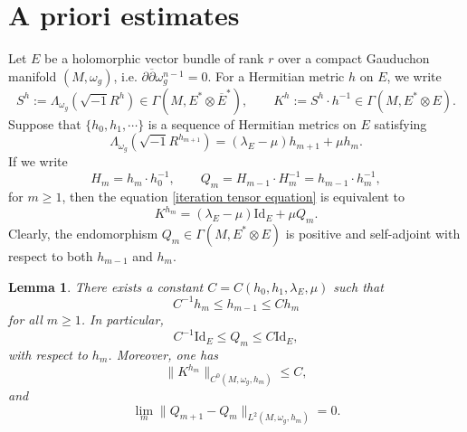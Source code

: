 \documentclass[12pt, reqno]{amsart}
\newcommand{\id}{\mathrm{Id}}
\newcommand\bp{{\bar\partial}}
\theoremstyle{plain}
\newtheorem{lemma}[thm]{Lemma}
\theoremstyle{definition}
\newcommand{\blemma}{\begin{lemma}}
\newcommand{\elemma}{\end{lemma}}
\newcommand{\p}{\partial}
\renewcommand{\bar}{\overline}
\newcommand{\beq}{\begin{equation}}
\newcommand{\eeq}{\end{equation}}
\renewcommand{\bp}{\bar{\partial}}
\newcommand{\ts}{\otimes}
\renewcommand{\>}{\rightarrow}
\newcommand{\om}{\omega}
\numberwithin{equation}{section}
\begin{document}
\baselineskip
\section{A priori estimates}\label{background section}
Let $E$ be a holomorphic vector bundle of rank $r$ over a compact Gauduchon manifold $(M,\om_g)$, i.e. $\p\bp\omega_g^{n-1}=0$.
For a Hermitian metric $h$ on $E$, we write
\begin{equation}
S^h:=\Lambda_{\omega_g}\left(\sqrt{-1}R^h\right)
\in\Gamma(M,E^*\ts\bar E^*),
\qquad
K^h:=S^h\cdot h^{-1}\in\Gamma(M,E^*\ts E).
\label{S and K}
\end{equation}
Suppose that $\{h_0,h_1,\cdots\}$ is a sequence of Hermitian metrics on $E$ satisfying
\beq 
\Lambda_{\omega_g}\left(\sqrt{-1}R^{h_{m+1}}\right)
=(\lambda_E-\mu)h_{m+1}+\mu h_m. \label{iteration tensor equation}
\eeq 
If we write
\begin{equation}
H_m=h_m\cdot h_0^{-1},
\qquad
Q_m=H_{m-1}\cdot H_m^{-1}=h_{m-1}\cdot h_m^{-1},
\label{H Q definition}
\end{equation}
for $m\geq 1$, then the equation \eqref{iteration tensor equation} is equivalent to
\begin{equation}
K^{h_m}=(\lambda_E-\mu)\id_E+\mu Q_m.
\label{iteration endomorphism equation}
\end{equation}
Clearly,  the  endomorphism $Q_m\in \Gamma(M,E^*\ts E)$ is positive and self-adjoint with respect to both $h_{m-1}$ and $h_m$.


\blemma\label{adjacent comparison lemma}
There exists a constant $C=C(h_0,h_1,\lambda_E ,\mu)$ such that
\begin{equation}
C^{-1}h_m\leq h_{m-1}\leq Ch_m
\label{adjacent comparison estimate}
\end{equation}
for all $m\geq 1$. 
In particular,
\begin{equation}
C^{-1}\id_E\leq Q_m\leq C\id_E,
\label{Qbounds}
\end{equation} with respect to $h_m$.
Moreover, one has
\begin{equation}
\|K^{h_m}\|_{C^0(M,\om_g,h_m)}\leq C,
\label{K bounds}
\end{equation}
and 
\beq \lim_m \|Q_{m+1}-Q_m\|_{L^2(M,\om_g,h_m)}=0. \label{dm tends zero}\eeq 
\elemma
\end{document}

